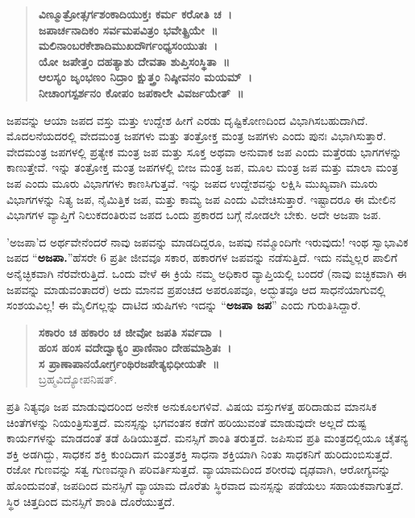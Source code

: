 {\begin{verse}
\textbf{ವಿಣ್ಮೂತ್ರೋತ್ಸರ್ಗಶಂಕಾದಿಯುಕ್ತಃ ಕರ್ಮ ಕರೋತಿ ಚ~। \\
ಜಪಾರ್ಚನಾದಿಕಂ ಸರ್ವಮಪವಿತ್ರಂ ಭವೇತ್ಪ್ರಿಯೇ~॥\\
ಮಲಿನಾಂಬರಕೇಶಾದಿಮುಖದೌರ್ಗಂಧ್ಯಸಂಯುತಃ~। \\
ಯೋ ಜಪೇತ್ತಂ ದಹತ್ಯಾಶು ದೇವತಾ ಶುಪ್ತಿಸಂಸ್ಥಿತಾ~॥\\
ಆಲಸ್ಯಂ ಜೃಂಭಣಂ ನಿದ್ರಾಂ ಕ್ಷುತ್ತ್ರಂ ನಿಷ್ಠೀವನಂ ಮಯಮ್~। \\
ನೀಚಾಂಗಸ್ಪರ್ಶನಂ ಕೋಪಂ ಜಪಕಾಲೇ ವಿವರ್ಜಯೇತ್~॥}
\end{verse}
ಜಪವನ್ನು ಆಯಾ ಜಪದ ವಸ್ತು ಮತ್ತು ಉದ್ದೇಶ ಹೀಗೆ ಎರಡು ದೃಷ್ಟಿಕೋಣದಿಂದ ವಿಭಾಗಿಸಬಹುದಾಗಿದೆ. ಮೊದಲನೆಯದರಲ್ಲಿ ವೇದಮಂತ್ರ ಜಪಗಳು ಮತ್ತು ತಂತ್ರೋಕ್ತ ಮಂತ್ರ ಜಪಗಳು ಎಂದು ಪುನಃ ವಿಭಾಗಿಸುತ್ತಾರೆ. ವೇದಮಂತ್ರ ಜಪಗಳಲ್ಲಿ ಪ್ರತ್ಯೇಕ ಮಂತ್ರ ಜಪ ಮತ್ತು ಸೂಕ್ತ ಅಥವಾ ಅನುವಾಕ ಜಪ ಎಂದು ಮತ್ತೆರಡು ಭಾಗಗಳನ್ನು ಕಾಣುತ್ತೇವೆ. ಇನ್ನು ತಂತ್ರೋಕ್ತ ಮಂತ್ರ ಜಪಗಳಲ್ಲಿ ಬೀಜ ಮಂತ್ರ ಜಪ, ಮೂಲ ಮಂತ್ರ ಜಪ ಮತ್ತು ಮಾಲಾ ಮಂತ್ರ ಜಪ ಎಂದು ಮೂರು ವಿಭಾಗಗಳು ಕಾಣಸಿಗುತ್ತವೆ. ಇನ್ನು ಜಪದ ಉದ್ದೇಶವನ್ನು ಲಕ್ಷಿಸಿ ಮುಖ್ಯವಾಗಿ ಮೂರು ವಿಭಾಗಗಳನ್ನು ನಿತ್ಯ ಜಪ, ನೈಮಿತ್ತಿಕ ಜಪ, ಮತ್ತು ಕಾಮ್ಯ ಜಪ ಎಂದು ವಿವೇಚಿಸುತ್ತಾರೆ. ಇಷ್ಟಾದರೂ ಈ ಮೇಲಿನ ವಿಭಾಗಗಳ ವ್ಯಾಪ್ತಿಗೆ ನಿಲುಕದಂತಿರುವ ಜಪದ ಒಂದು ಪ್ರಕಾರದ ಬಗ್ಗೆ ನೋಡಲೇ ಬೇಕು. ಅದೇ ಅಜಪಾ ಜಪ.

’ಅಜಪಾ’ದ ಅರ್ಥವೇನೆಂದರೆ ನಾವು ಜಪವನ್ನು ಮಾಡದಿದ್ದರೂ, ಜಪವು ನಮ್ಮೊಂದಿಗೇ ಇರುವುದು! ಇಂಥ ಸ್ವಾಭಾವಿಕ ಜಪದ “\textbf{ಅಜಪಾ.}”ಹೆಸರೇ 6 ಪ್ರತೀ ಜೀವವೂ ಸಕಾರ, ಹಕಾರಗಳ ಜಪವನ್ನು ನಡೆಸುತ್ತಿದೆ. ಇದು ನಮ್ಮೆಲ್ಲರ ಪಾಲಿಗೆ ಅನೈಚ್ಛಿಕವಾಗಿ ನೆರವೇರುತ್ತಿದೆ. ಒಂದು ವೇಳೆ ಈ ಕ್ರಿಯೆ ನಮ್ಮ ಅಧಿಕಾರ ವ್ಯಾಪ್ತಿಯಲ್ಲಿ ಬಂದರೆ (ನಾವು ಐಚ್ಛಿಕವಾಗಿ ಈ ಜಪವನ್ನು ಮಾಡುವಂತಾದರೆ) ಅದು ಮಾನವ ಪ್ರಪಂಚದ ಅಪರೂಪವೂ, ಅದ್ಭುತವೂ ಆದ ಸಾಧನೆಯಾಗುವಲ್ಲಿ ಸಂಶಯವಿಲ್ಲ! ಈ ಮೈಲಿಗಲ್ಲನ್ನು ದಾಟಿದ ಋಷಿಗಳು ಇದನ್ನು “\textbf{ಅಜಪಾ ಜಪ}” ಎಂದು ಗುರುತಿಸಿದ್ದಾರೆ.
\begin{verse}
\textbf{ಸಕಾರಂ ಚ ಹಕಾರಂ ಚ ಜೀವೋ ಜಪತಿ ಸರ್ವದಾ~।  \\
ಹಂಸ ಹಂಸ ವದೇದ್ವಾಕ್ಯಂ ಪ್ರಾಣಿನಾಂ ದೇಹಮಾಶ್ರಿತಃ~। \\
ಸ ಪ್ರಾಣಾಪಾನಯೋರ್ಗ್ರಂಥಿರಜಪೇತ್ಯಭಿಧೀಯತೇ~॥}\\
\hspace{5cm}ಬ್ರಹ್ಮವಿದ್ಯೋಪನಿಷತ್.
\end{verse}
ಪ್ರತಿ ನಿತ್ಯವೂ ಜಪ ಮಾಡುವುದರಿಂದ ಅನೇಕ ಅನುಕೂಲಗಳಿವೆ. ವಿಷಯ ವಸ್ತುಗಳತ್ತ ಹರಿದಾಡುವ ಮಾನಸಿಕ ಚಿಂತೆಗಳನ್ನು ನಿಯಂತ್ರಿಸುತ್ತದೆ. ಮನಸ್ಸನ್ನು ಭಗವಂತನ ಕಡೆಗೆ ಹರಿಯುವಂತೆ ಮಾಡುವುದೇ ಅಲ್ಲದೆ ದುಷ್ಟ ಕಾರ್ಯಗಳನ್ನು ಮಾಡದಂತೆ ತಡೆ ಹಿಡಿಯುತ್ತದೆ. ಮನಸ್ಸಿಗೆ ಶಾಂತಿ ತರುತ್ತದೆ. ಜಪಿಸುವ ಪ್ರತಿ ಮಂತ್ರದಲ್ಲಿಯೂ ಚೈತನ್ಯ ಶಕ್ತಿ ಅಡಗಿದ್ದು, ಸಾಧಕನ ಶಕ್ತಿ ಕುಂದಿದಾಗ ಮಂತ್ರಶಕ್ತಿ ಸಾಧನಾ ಶಕ್ತಿಯಾಗಿ ನಿಂತು ಸಾಧಕನಿಗೆ ಹುರಿದುಂಬಿಸುತ್ತದೆ. ರಜೋ ಗುಣವನ್ನು ಸತ್ವ ಗುಣವನ್ನಾಗಿ ಪರಿವರ್ತಿಸುತ್ತದೆ. ವ್ಯಾಯಾಮದಿಂದ ಶರೀರವು ದೃಢವಾಗಿ, ಆರೋಗ್ಯವನ್ನು ಹೊಂದುವಂತೆ, ಜಪದಿಂದ ಮನಸ್ಸಿಗೆ ವ್ಯಾಯಾಮ ದೊರೆತು ಸ್ಥಿರವಾದ ಮನಸ್ಸನ್ನು ಪಡೆಯಲು ಸಹಾಯಕವಾಗುತ್ತದೆ. ಸ್ಥಿರ  ಚಿತ್ತದಿಂದ ಮನಸ್ಸಿಗೆ ಶಾಂತಿ ದೊರೆಯುತ್ತದೆ.

}
